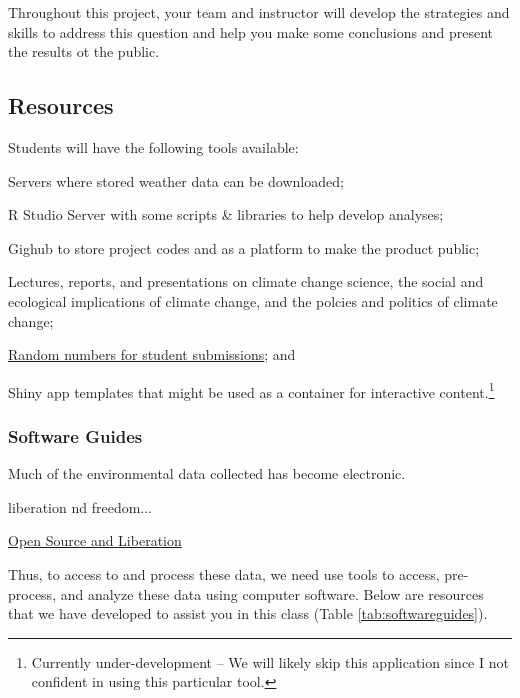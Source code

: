 \documentclass{article}\usepackage[]{graphicx}\usepackage[]{color}
\newenvironment{itemize*}%
  {\begin{itemize}%
    \setlength{\itemsep}{0pt}%
    \setlength{\parskip}{0pt}}%
  {\end{itemize}}
\begin{document}
Throughout this project, your team and instructor will develop the strategies and skills to address this question and help you make some conclusions and present the results ot the public.

\subsection{Resources}

Students will have the following tools available:

\begin{itemize*}
  \item Servers where stored weather data can be downloaded;
  \item R Studio Server with some scripts \& libraries to help develop analyses;
  \item Gighub to store project codes and as a platform to make the product public;
  \item Lectures, reports, and presentations on climate change science, the social and ecological implications of climate change, and the polcies and politics of climate change;
  \item \href{https://github.com/marclos/Climate_Change_Narratives/raw/master/Admin/RandomNumbers.pdf}{Random numbers for student submissions}; and
  \item Shiny app templates that might be used as a container for interactive content.\footnote{Currently under-development -- We will likely skip this application since I not confident in using this particular tool.}
\end{itemize*}

\subsubsection{Software Guides}

Much of the environmental data collected has become electronic. 

liberation nd freedom...

\href{https://github.com/marclos/Climate_Change_Narratives/raw/master/Admin/Liberation_via_Open_Source_Software.pdf}{Open Source and Liberation}


Thus, to access to and process these data, we need use tools to access, pre-process, and analyze these data using computer software. Below are resources that we have developed to assist you in this class (Table \ref{tab:softwareguides}).
\end{document}
